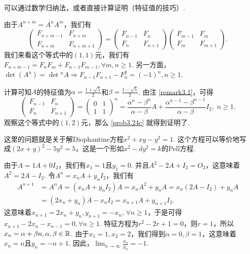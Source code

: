 \begin{solution}
  \begin{inparaenum}[(a)]
    \item 可以通过数学归纳法，或者直接计算证明（特征值的技巧）.

    \item 由于$A^{n+m}=A^nA^m$，我们有
    \[
      \begin{pmatrix}
        F_{n+m-1} & F_{n+m} \\
        F_{n+m} & F_{n+m+1}
      \end{pmatrix} =
      \begin{pmatrix}
        F_{n-1} & F_n \\
        F_n & F_{n+1}
      \end{pmatrix}
      \begin{pmatrix}
        F_{m-1} & F_m \\
        F_m & F_{m+1}
      \end{pmatrix}.
    \]
    我们来看这个等式中的$(1,1)$元，我们有$F_{n+m-1}=F_nF_m+F_{n-1}F_{m-1},\forall m,n\ge1$. 另一方面，$\det(A^n)=\det{}^nA\Rightarrow F_{n-1}F_{n+1}-F_n^2=(-1)^n,n\ge1$.

    \item 计算可知$A$的特征值为$\alpha=\frac{1+\sqrt5}2$和$\beta=\frac{1-\sqrt5}2$.
        由注 \ref{remark3.1}，可得
        \[
          \begin{pmatrix}
            F_{n-1} & F_n \\
            F_n & F_{n+1}
          \end{pmatrix} =
          \begin{pmatrix}
            0 & 1 \\
            1 & 1
          \end{pmatrix}^n = \frac{\alpha^n-\beta^n}{\alpha-\beta}A +
          \frac{\alpha^{n-1}-\beta^{n-1}}{\alpha-\beta}
          I_2,\; n\ge1.
        \]
        观察这个等式中的$(1,2)$元，那么 \ref{prob3.24c} 就得到证明了.
  \end{inparaenum}
\end{solution}

\begin{solution}
  这里的问题就是关于解Diophantine方程$x^2+xy-y^2=1$. 这个方程可以等价地写成$(2x+y)^2-5y^2=5$，这是一个形如$x^2-dy^2=k$的Pell方程.
\end{solution}

\begin{solution}
  由于$A=1A+0I_2$，我们有$x_1=1$且$y_1=0$. 并且$A^2-2A+I_2=O_2$，这意味着$A^2=2A-I_2$. 令$A^n=x_nA+y_nI_2$，我们有
  \begin{align*}
    A^{n+1} & = A^nA = (x_nA + y_nI_2)A = x_nA^2 + y_nA = x_n(2A - I_2) + y_nA \\
    & = (2x_n + y_n)A - x_nI_2 = x_{n+1}A + y_{n+1}I_2.
  \end{align*}
  这意味着$x_{n+1}=2x_n+y_n,y_{n+1}=-x_n,\,\forall n\ge1$，于是可得$x_{n+1}-2x_n-x_{n-1}=0,\forall n\ge1$. 特征方程为$r^2-2r+1=0$，则$r=1$，所以$x_n=\alpha+\beta n,\alpha,\beta\in\mathbb R$. 由于$x_1=1,x_2=2$，我们得到$\alpha=0,\beta=1$，这意味着$x_n=n$且$y_n=-n+1$. 因此，$\lim_{n\to\infty}\frac{x_n}{y_n}=-1$.
\end{solution}

